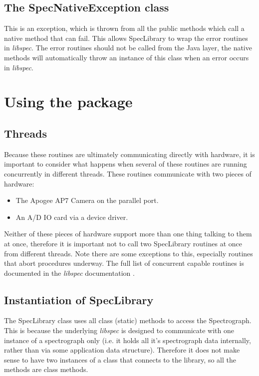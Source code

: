 \documentclass[10pt,a4paper]{article}
\begin{document}
\subsection{The SpecNativeException class}
This is an exception, which is thrown from all the public methods which call a native method that can fail.
This allows SpecLibrary to wrap the error routines in {\em libspec}. The error routines should not
be called from the Java layer, the native methods will automatically throw an instance of this class
when an error occurs in {\em libspec}.

\section{Using the package}
\subsection{Threads}
Because these routines are ultimately communicating directly with hardware, it is important to
consider what happens when several of these routines are running concurrently in different threads. These
routines communicate with two pieces of hardware:
\begin{itemize}
\item The Apogee AP7 Camera on the parallel port.
\item An A/D IO card via a device driver.
\end{itemize}
Neither of these pieces of hardware support more than one thing talking to them at once, therefore it is 
important not to call two SpecLibrary routines at once from different threads. Note there are some exceptions to this,
especially routines that abort procedures underway. The full list of concurrent capable routines is documented
in the {\em libspec} documentation \cite{bib:libspec}.

\subsection{Instantiation of SpecLibrary}
The SpecLibrary class uses all class (static) methods to access the Spectrograph. This is because the 
underlying {\em libspec} is designed to communicate with one instance of a spectrograph only (i.e. it holds all it's
spectrograph data internally, rather than via some application data structure). Therefore it does not make
sense to have two instances of a class that connects to the library, so all the methods are class methods.
\end{document}

